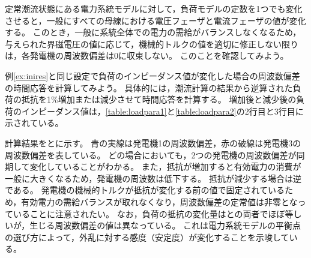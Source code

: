 \documentclass[tombow,dvipdfmx]{corona-a5-1.1}
\begin{document}
定常潮流状態にある電力系統モデルに対して，負荷モデルの定数を1つでも変化させると，一般にすべての母線における電圧フェーザと電流フェーザの値が変化する。
このとき，一般に系統全体での電力の需給がバランスしなくなるため，与えられた界磁電圧の値に応じて，機械的トルクの値を適切に修正しない限りは，各発電機の周波数偏差は0に収束しない。
このことを確認してみよう。

\begin{例}[負荷のインピーダンス変化に対する電力系統モデルの時間応答]\label{ex:loadpv}
例\ref{ex:inires}と同じ設定で負荷のインピーダンス値が変化した場合の周波数偏差の時間応答を計算してみよう。
具体的には，潮流計算の結果から逆算された負荷の抵抗を1\%増加または減少させて時間応答を計算する。
増加後と減少後の負荷のインピーダンス値は，\ref{table:loadpara1}と\ref{table:loadpara2}の2行目と3行目に示されている。

計算結果をとに示す。
青の実線は発電機1の周波数偏差，赤の破線は発電機3の周波数偏差を表している。
どの場合においても，2つの発電機の周波数偏差が同期して変化していることがわかる。
また，抵抗が増加すると有効電力の消費が一般に大きくなるため，発電機の周波数は低下する。
抵抗が減少する場合は逆である。
発電機の機械的トルクが抵抗が変化する前の値で固定されているため，有効電力の需給バランスが取れなくなり，周波数偏差の定常値は非零となっていることに注意されたい。
なお，負荷の抵抗の変化量はとの両者でほぼ等しいが，生じる周波数偏差の値は異なっている。
これは電力系統モデルの平衡点の選び方によって，外乱に対する感度（安定度）が変化することを示唆している。
\end{例}
\end{document}
